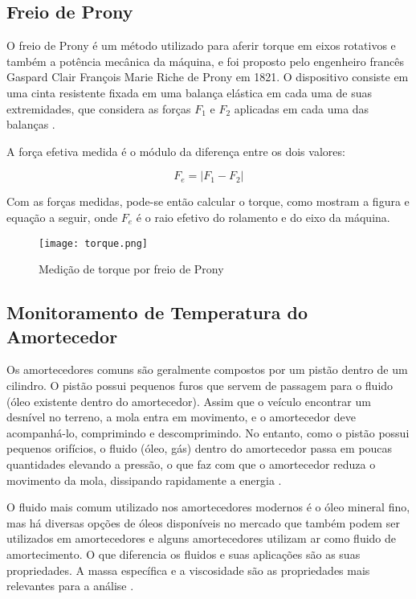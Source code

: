 	 	\subsection{Freio de Prony}

			O freio de Prony é um método utilizado para aferir torque em eixos rotativos e também a potência mecânica da máquina, e foi proposto pelo engenheiro francês Gaspard Clair François Marie Riche de Prony em 1821. O dispositivo consiste em uma cinta resistente fixada em uma balança elástica em cada uma de suas extremidades, que considera as forças $F_{1}$ e $F_{2}$ aplicadas em cada uma das balanças \cite{Pereira}. 

			A força efetiva medida é o módulo da diferença entre os dois valores:

			$$ F_e= |F_1-F_2 | $$

			Com as forças medidas, pode-se então calcular o torque, como mostram a figura e equação a seguir, onde $F_{e}$ é o raio efetivo do rolamento e do eixo da máquina.

			\newpage
			\begin{figure}[!h]
				\centering
				\texttt{[image: torque.png]}
				\caption[Medição de torque por freio de Prony]{Medição de torque por freio de Prony \cite{Calixto}} 
				\label{torque}
			\end{figure}

		\subsection{Monitoramento de Temperatura do Amortecedor}

			Os amortecedores comuns são geralmente compostos por um pistão dentro de um cilindro. O pistão possui pequenos furos que servem de passagem para o fluido (óleo existente dentro do amortecedor). Assim que o veículo encontrar um desnível no terreno, a mola entra em movimento, e o amortecedor deve acompanhá-lo, comprimindo e descomprimindo. No entanto, como o pistão possui pequenos orifícios, o fluido (óleo, gás) dentro do amortecedor passa em poucas quantidades elevando a pressão, o que faz com que o amortecedor reduza o movimento da mola, dissipando rapidamente a energia \cite{Dias}.
			
			O fluido mais comum utilizado nos amortecedores modernos é o óleo mineral fino, mas há diversas opções de óleos disponíveis no mercado que também podem ser utilizados em amortecedores e alguns amortecedores utilizam ar como fluido de amortecimento. O que diferencia os fluidos e suas aplicações são as suas propriedades. A massa específica e a viscosidade são as propriedades mais relevantes para a análise \cite{DOliveira}.
			

